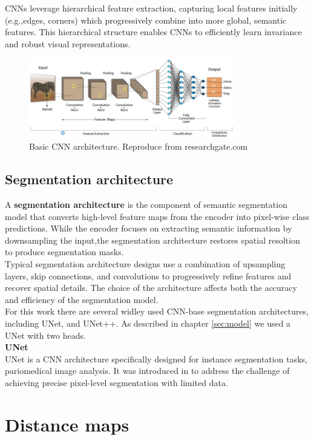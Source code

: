 \documentclass[target=bach,aauheader=,style=]{thud}
\begin{document}
CNNs leverage hierarchical feature extraction, capturing local features initially (e.g.,edges, corners) which progressively combine into more global, semantic features. This hierarchical structure  enables CNNs to efficiently learn invariance and robust visual representations.
\begin{figure}[h]
    \centering
    \includegraphics[width=0.8\textwidth]{imgs/CNN.png}
    \caption{Basic CNN architecture. Reproduce from researchgate.com}
\end{figure}
\subsection{Segmentation architecture}
A \textbf{segmentation architecture} is the component of semantic segmentation model that converts high-level feature maps from the encoder into pixel-wise class predictions. While the encoder focuses on extracting semantic information by downsampling the input,the segmentation architecture restores spatial resoltion to produce segmentation masks.\\
Typical segmentation architecture designs use a combination of upsampling layers, skip connections, and convolutions to progressively refine features and recover spatial details. The choice of the architecture affects both the accuracy and efficiency of the segmentation model. \\
For this work there are several widley used CNN-base segmentation architectures, including UNet, and UNet++. As described in chapter \ref{sec:model} we used a UNet with two heads.\\

\noindent\textbf{UNet}\\

\noindent UNet is a CNN architecture specifically designed for instance segmentation tasks, pariomedical image analysis. It was introduced in \cite{DBLP:journals/corr/RonnebergerFB15} to address the challenge of achieving precise pixel-level segmentation with limited data. 
\section{Distance maps}
\end{document}
